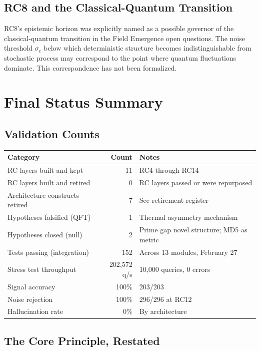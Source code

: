 \documentclass[11pt]{article}
\begin{document}
\subsection{RC8 and the Classical-Quantum Transition}

RC8's epistemic horizon was explicitly named as a possible governor of the classical-quantum transition in the Field Emergence open questions. The noise threshold $\sigma_c$ below which deterministic structure becomes indistinguishable from stochastic process may correspond to the point where quantum fluctuations dominate. This correspondence has not been formalized.

\section{Final Status Summary}

\subsection{Validation Counts}

\begin{tabular}{lrl}
\toprule
\textbf{Category} & \textbf{Count} & \textbf{Notes} \\
\midrule
RC layers built and kept & 11 & RC4 through RC14 \\
RC layers built and retired & 0 & RC layers passed or were repurposed \\
Architecture constructs retired & 7 & See retirement register \\
Hypotheses falsified (QFT) & 1 & Thermal asymmetry mechanism \\
Hypotheses closed (null) & 2 & Prime gap novel structure; MD5 as metric \\
Tests passing (integration) & 152 & Across 13 modules, February 27 \\
Stress test throughput & 202,572 q/s & 10,000 queries, 0 errors \\
Signal accuracy & 100\% & 203/203 \\
Noise rejection & 100\% & 296/296 at RC12 \\
Hallucination rate & 0\% & By architecture \\
\bottomrule
\end{tabular}

\subsection{The Core Principle, Restated}
\end{document}
